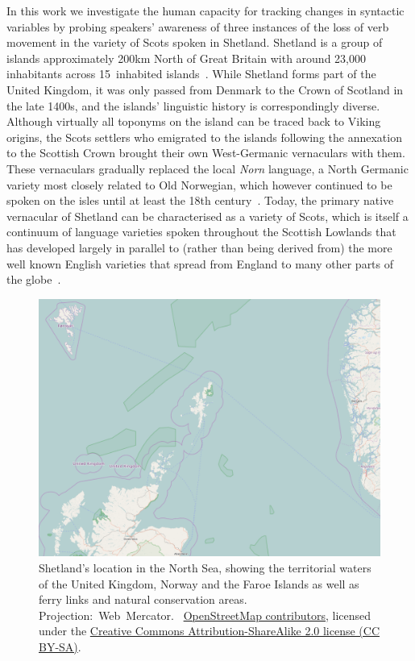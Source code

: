 In this work we investigate the human capacity for tracking changes in syntactic variables by probing speakers' awareness of three instances of the loss of verb movement in the variety of Scots spoken in Shetland. Shetland is a group of islands approximately 200km North of Great Britain with around 23,000 inhabitants across 15~inhabited islands~\citep[see also Figures~\ref{fig:shetlandcontext} and~\ref{fig:shetland}]{Shetland2014}. While Shetland forms part of the United Kingdom, it was only passed from Denmark to the Crown of Scotland in the late 1400s, and the islands' linguistic history is correspondingly diverse. Although virtually all toponyms on the island can be traced back to Viking origins, the Scots settlers who emigrated to the islands following the annexation to the Scottish Crown brought their own West-Germanic vernaculars with them. These vernaculars gradually replaced the local \emph{Norn} language, a North Germanic variety most closely related to Old Norwegian, which however continued to be spoken on the isles until at least the 18th century~\citep{Knooihuizen2009}. Today, the primary native vernacular of Shetland can be characterised as a variety of Scots, which is itself a continuum of language varieties spoken throughout the Scottish Lowlands that has developed largely in parallel to (rather than being derived from) the more well known English varieties that spread from England to many other parts of the globe~\citep[p.15]{Millar2007}.

\begin{figure}
\centering
\includegraphics{figure/shetlandcontext}
\caption[Shetland's location in the North Sea]{Shetland's location in the North Sea, showing the territorial waters of the United Kingdom, Norway and the Faroe Islands as well as ferry links and natural conservation areas. %
Projection:~Web~Mercator. \textcopyright~\href{http://www.openstreetmap.org/copyright}{OpenStreetMap contributors}, licensed under the \href{http://creativecommons.org/licenses/by-sa/2.0/}{Creative Commons Attribution-ShareAlike 2.0 license (CC BY-SA)}.}
\label{fig:shetlandcontext}
\end{figure}

